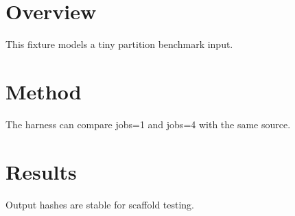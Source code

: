 \documentclass{article}
\begin{document}
\section{Overview}
This fixture models a tiny partition benchmark input.
\section{Method}
The harness can compare jobs=1 and jobs=4 with the same source.
\section{Results}
Output hashes are stable for scaffold testing.
\end{document}
